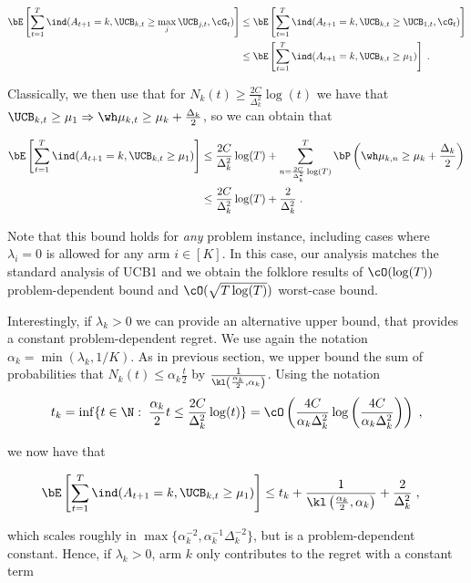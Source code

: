 \begin{align*}
\bE\left[\sum_{t=1}^T \ind(A_{t+1}=k, \UCB_{k, t}\geq \max_j \UCB_{j, t}, \cG_t)\right] & \leq \bE\left[\sum_{t=1}^T \ind(A_{t+1}=k, \UCB_{k, t}\geq \UCB_{1, t}, \cG_t)\right] \\
& \leq \bE\left[\sum_{t=1}^T \ind(A_{t+1}=k, \UCB_{k, t}\geq \mu_1)\right] \;. \end{align*}

Classically, we then use that for $N_k(t)\geq \frac{2C}{\Delta_k^2} \log(t)$ we have that $\UCB_{k, t}\geq \mu_1 \Rightarrow \wh \mu_{k, t} \geq \mu_k + \frac{\Delta_k}{2}$, so we can obtain that 

\begin{align*}
\bE\left[\sum_{t=1}^T \ind(A_{t+1}=k, \UCB_{k, t}\geq \mu_1)\right] &\leq \frac{2C}{\Delta_k^2} \log(T) + \sum_{n=\frac{2C}{\Delta_k^2} \log(T)}^T \bP\left(\wh \mu_{k, n}\geq \mu_k + \frac{\Delta_k}{2}\right) \\
& \leq \frac{2C}{\Delta_k^2} \log(T) + \frac{2}{\Delta_k^2} \;.
\end{align*}

Note that this bound holds for \emph{any} problem instance, including cases where $\lambda_i = 0$ is allowed for any arm $i \in [K]$. In this case, our analysis matches the standard analysis of UCB1 and we obtain the folklore results of $\cO(\log(T))$ problem-dependent bound and $\cO(\sqrt{T\log(T)})$ worst-case bound.

Interestingly, if $\lambda_k>0$ we can provide an alternative upper bound, that provides a constant problem-dependent regret. We use again the notation $\alpha_k=\min(\lambda_k, 1/K)$. As in previous section, we upper bound the sum of probabilities that $N_k(t)\leq \alpha_k \frac{t}{2}$ by $\frac{1}{\kl\left(\frac{\alpha_k}{2}, \alpha_k\right)}$. Using the notation \[t_k = \inf\{t\in \N: \; \frac{\alpha_k}{2}t\leq \frac{2C}{\Delta_k^2} \log(t) \}= \cO\left(\frac{4C}{\alpha_k \Delta_k^2}\log\left(\frac{4C}{\alpha_k\Delta_k^2}\right)\right)\;,\]

we now have that 

\begin{align*}
\bE\left[\sum_{t=1}^T \ind(A_{t+1}=k, \UCB_{k, t}\geq \mu_1)\right] &\leq t_k + \frac{1}{\kl\left(\frac{\alpha_k}{2}, \alpha_k\right)} + \frac{2}{\Delta_k^2} \;,
\end{align*}

which scales roughly in $\max\{\alpha_k^{-2}, \alpha_k^{-1}\Delta_k^{-2} \}$, but is a problem-dependent constant. Hence, if $\lambda_k>0$, arm $k$ only contributes to the regret with a constant term 

